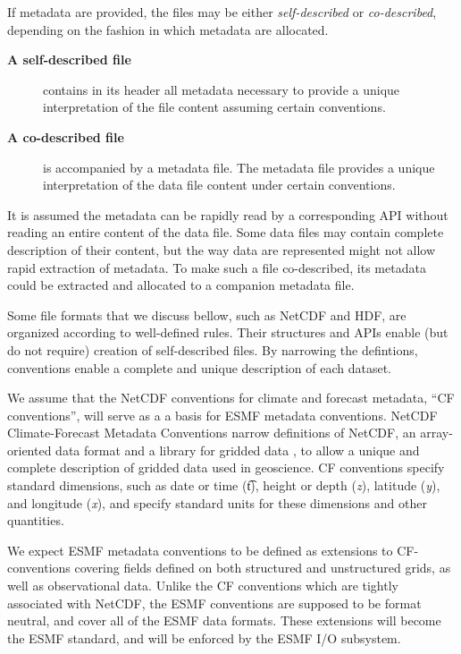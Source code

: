 If metadata are provided, the files may be either {\em self-described} or
{\em co-described}, depending on the fashion in which metadata are allocated.
\begin{description}
\item[\bf A self-described file] contains in its header all metadata 
necessary to provide a unique interpretation of the file content
assuming certain conventions.  
\item[\bf A co-described file] is accompanied by a metadata file. The
metadata file provides a unique interpretation of the data file content
under certain conventions. 
\end{description}
It is assumed the metadata can be rapidly read by a corresponding API without 
reading an entire content of the data file. Some data files may contain 
complete description of their content, but the way data are represented might 
not allow rapid extraction of metadata. To make such a file co-described, its 
metadata could be extracted and allocated to a companion metadata file.

Some file formats that we discuss bellow, such as NetCDF and HDF, are 
organized according to well-defined rules. Their structures and APIs enable 
(but do not require) creation of self-described files. By narrowing 
the defintions, conventions enable a complete and unique description of each 
dataset.

We assume that the NetCDF conventions for climate and forecast metadata, 
``CF conventions'', will serve as a a basis for ESMF metadata conventions.
 NetCDF Climate-Forecast Metadata Conventions
\cite{NetCDF_CF_v1_beta3} narrow definitions of NetCDF, an
array-oriented data format and a library for gridded data 
\cite{NetCDF3_UsersGuide_C}, to allow a unique and complete description
of gridded data used in geoscience. CF conventions specify standard 
dimensions, such as date or time ({\t t}), height or depth ({\it z}), 
latitude ({\it y}), and longitude ({\it x}), and specify standard
units for these dimensions and other quantities. 


We expect ESMF metadata conventions to be defined as extensions to
CF-conventions covering fields defined on both structured and
unstructured grids, as well as observational data. Unlike the CF
conventions which are tightly associated with NetCDF, the ESMF
conventions are supposed to be format neutral, and cover all of the
ESMF data formats.  These extensions will become the ESMF standard,
and will be enforced by the ESMF I/O subsystem.


